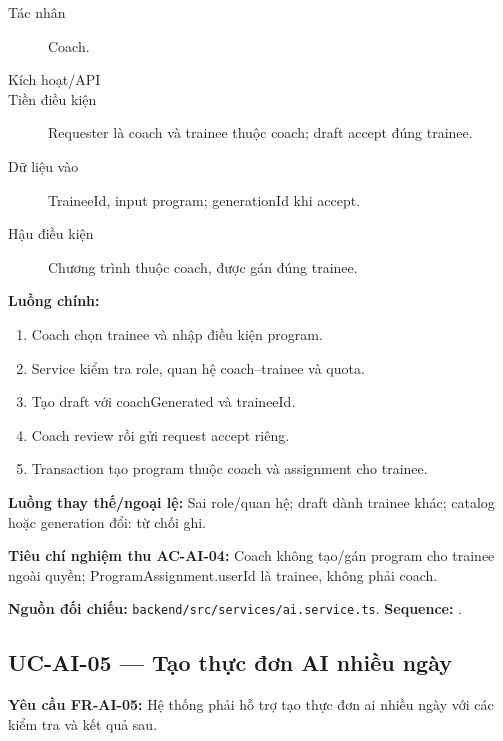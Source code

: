 \documentclass[12pt,a4paper]{article}
\newcommand{\evidence}[1]{{\small\nolinkurl{#1}}}
\begin{document}
\begin{description}
\item[Tác nhân] Coach.
\item[Kích hoạt/API] 
\item[Tiền điều kiện] Requester là coach và trainee thuộc coach; draft accept đúng trainee.
\item[Dữ liệu vào] TraineeId, input program; generationId khi accept.
\item[Hậu điều kiện] Chương trình thuộc coach, được gán đúng trainee.
\end{description}
\textbf{Luồng chính:}
\begin{enumerate}
  \item Coach chọn trainee và nhập điều kiện program.
  \item Service kiểm tra role, quan hệ coach–trainee và quota.
  \item Tạo draft với coachGenerated và traineeId.
  \item Coach review rồi gửi request accept riêng.
  \item Transaction tạo program thuộc coach và assignment cho trainee.
\end{enumerate}
\textbf{Luồng thay thế/ngoại lệ:} Sai role/quan hệ; draft dành trainee khác; catalog hoặc generation đổi: từ chối ghi.

\textbf{Tiêu chí nghiệm thu AC-AI-04:} Coach không tạo/gán program cho trainee ngoài quyền; ProgramAssignment.userId là trainee, không phải coach.

\textbf{Nguồn đối chiếu:} \evidence{backend/src/services/ai.service.ts}. \textbf{Sequence:} .

\subsection{UC-AI-05 --- Tạo thực đơn AI nhiều ngày}
\label{uc-ai-5}
\textbf{Yêu cầu FR-AI-05:} Hệ thống phải hỗ trợ tạo thực đơn ai nhiều ngày với các kiểm tra và kết quả sau.
\end{document}
